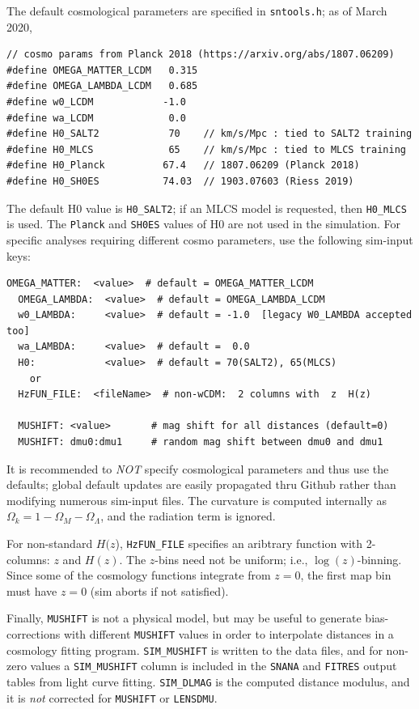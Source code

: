 \documentclass[12pt]{article}
\newcommand{\OM}{\Omega_M}
\newcommand{\OL}{\Omega_{\Lambda}}
\newcommand{\Ok}{\Omega_k}
\begin{document}
{The default cosmological parameters are specified in {\tt sntools.h};
as of March 2020,
%
\begin{Verbatim}[frame=single]
// cosmo params from Planck 2018 (https://arxiv.org/abs/1807.06209)
#define OMEGA_MATTER_LCDM   0.315 
#define OMEGA_LAMBDA_LCDM   0.685 
#define w0_LCDM            -1.0
#define wa_LCDM             0.0
#define H0_SALT2            70    // km/s/Mpc : tied to SALT2 training
#define H0_MLCS             65    // km/s/Mpc : tied to MLCS training
#define H0_Planck          67.4   // 1807.06209 (Planck 2018)
#define H0_SH0ES           74.03  // 1903.07603 (Riess 2019)
\end{Verbatim}
%
The default H0 value is {\tt H0\_SALT2};
if an MLCS model is requested, then {\tt H0\_MLCS} is used.
The {\tt Planck} and {\tt SH0ES} values of H0 are not used 
in the simulation.
For specific analyses requiring different cosmo parameters, 
use the following sim-input keys:
%
\begin{Verbatim}[frame=single]
  OMEGA_MATTER:  <value>  # default = OMEGA_MATTER_LCDM
  OMEGA_LAMBDA:  <value>  # default = OMEGA_LAMBDA_LCDM
  w0_LAMBDA:     <value>  # default = -1.0  [legacy W0_LAMBDA accepted too]
  wa_LAMBDA:     <value>  # default =  0.0
  H0:            <value>  # default = 70(SALT2), 65(MLCS)
    or
  HzFUN_FILE:  <fileName>  # non-wCDM:  2 columns with  z  H(z)

  MUSHIFT: <value>       # mag shift for all distances (default=0)
  MUSHIFT: dmu0:dmu1     # random mag shift between dmu0 and dmu1
\end{Verbatim}
%
It is recommended to {\it NOT} specify cosmological parameters and thus
use the defaults; global default updates are easily propagated thru 
Github rather than modifying numerous sim-input files.
The curvature is computed internally as $\Ok = 1 - \OM - \OL$,
and the radiation term is ignored. 

For non-standard $H(z$), {\tt HzFUN\_FILE} specifies an aribtrary
function with 2-columns: $z$ and $H(z)$. 
The $z$-bins need not be uniform; i.e., $\log(z)$-binning. 
Since some of the cosmology functions integrate from $z=0$, 
the first map bin must have $z=0$ (sim aborts if not satisfied).

Finally, {\tt MUSHIFT} is not a physical model, but may be useful
to generate bias-corrections with different {\tt MUSHIFT} values
in order to interpolate distances in a cosmology fitting program.
{\tt SIM\_MUSHIFT} is written to the data files, and for non-zero values
a {\tt SIM\_MUSHIFT} column is included in the {\tt SNANA} and {\tt FITRES} 
output tables from light curve fitting.
{\tt SIM\_DLMAG} is the computed distance modulus, and it is {\it not}
corrected for {\tt MUSHIFT} or {\tt LENSDMU}. 

}
\end{document}
